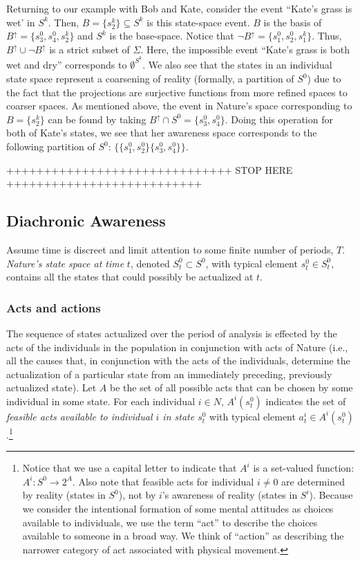 \documentclass[
11pt,
titlepage,
reqno,
]{article}%
\theoremstyle{definition}
\begin{document}
	 Returning to our example with Bob and Kate, consider the event ``Kate's grass is wet' in $S^k$. 
	 Then, $B=\{s^k_2\}\subseteq S^k$ is this state-space event.
	 $B$ is the basis of $B^{\uparrow}=\{s^0_3,s^0_4,s^k_2\}$ and $S^k$ is the base-space.
	 Notice that $\lnot B^{\uparrow}=\{s^0_1,s^0_2,s^k_1\}$.
	 Thus, $B^{\uparrow}\cup \lnot B^{\uparrow}$ is a strict subset of $\Sigma$.
	 Here, the impossible event ``Kate's grass is both wet and dry'' corresponds to $\emptyset^{S^k}$.
	 We also see that the states in an individual state space represent a coarsening of reality (formally, a partition of $S^0$) due to the fact that the projections are surjective functions from more refined spaces to coarser spaces.
	 As mentioned above, the event in Nature's space corresponding to $B=\{s^k_2\}$ can be found by taking $B^\uparrow\cap S^0=\{s^0_3,s^0_4\}$.
	 Doing this operation for both of Kate's states, we see that her awareness space corresponds to the following partition of $S^0$: $\{\{s^0_1,s^0_2\}\{s^0_3,s^0_4\}\}$.

++++++++++++++++++++++++++++++ STOP HERE ++++++++++++++++++++++++++
\subsection{Diachronic Awareness}\label{sec:diachronic_setup}

	Assume time is discreet and limit attention to some finite number of periods, $T$. 
	\textit{Nature's state space at time} $t$, denoted $S^0_t\subset S^0$, with typical element $s^0_t\in S^0_t$, contains all the states that could possibly be actualized at $t$.

\subsubsection{Acts and actions\label{sec:dynamics}}
	The sequence of states actualized over the period of analysis is effected by the acts of the individuals in the population in conjunction with acts of Nature (i.e., all the causes that, in conjunction with the acts of the individuals, determine the actualization of a particular state from an immediately preceding, previously actualized state).
	Let $A$ be the set of all possible acts that can be chosen by some individual in some state.
	For each individual $i\in N$,  $A^i(s^0_t)$ indicates the set of \textit{feasible acts available to individual $i$ in state $s^0_t$} with typical element $a^i_t\in A^i(s^0_t)$.\footnote
	{
		Notice that we use a capital letter to indicate that $A^i$ is a set-valued function: $A^i:S^0\rightarrow 2^A$.
		Also note that feasible acts for individual $i\ne 0$ are determined by reality (states in $S^0$), not by $i$'s awareness of reality (states in $S^i$).
		Because we consider the intentional formation of some mental attitudes as choices available to individuals, we use the term ``act'' to describe the choices available to someone in a broad way.
		We think of ``action'' as describing the narrower category of act associated with physical movement.
	} 
	
\end{document}
